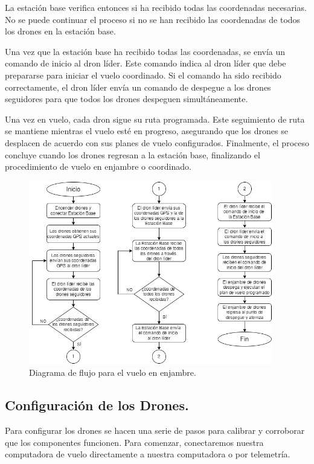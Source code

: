\noindent La estación base verifica entonces si ha recibido todas las coordenadas necesarias. No se puede continuar el proceso si no se han recibido las coordenadas de todos los drones en la estación base. 

\noindent Una vez que la estación base ha recibido todas las coordenadas, se envía un comando de inicio al dron líder. Este comando indica al dron líder que debe prepararse para iniciar el vuelo coordinado. Si el comando ha sido recibido correctamente, el dron líder envía un comando de despegue a los drones seguidores para que todos los drones despeguen simultáneamente.

\noindent Una vez en vuelo, cada dron sigue su ruta programada. Este seguimiento de ruta se mantiene mientras el vuelo esté en progreso, asegurando que los drones se desplacen de acuerdo con sus planes de vuelo configurados. Finalmente, el proceso concluye cuando los drones regresan a la estación base, finalizando el procedimiento de vuelo en enjambre o coordinado.

\begin{figure}[H]
    \centering
    \includegraphics[width=0.95\textwidth]{imagenes/diagrama-enjambre.jpg}
    \caption{Diagrama de flujo para el vuelo en enjambre.}
    \label{fig:diagrama-vuelo-enjambre}
\end{figure}


\subsection{Configuración de los Drones.}
Para configurar los drones se hacen una serie de pasos para calibrar y corroborar que los componentes funcionen. Para comenzar, conectaremos nuestra computadora de vuelo directamente a nuestra computadora o por telemetría.

